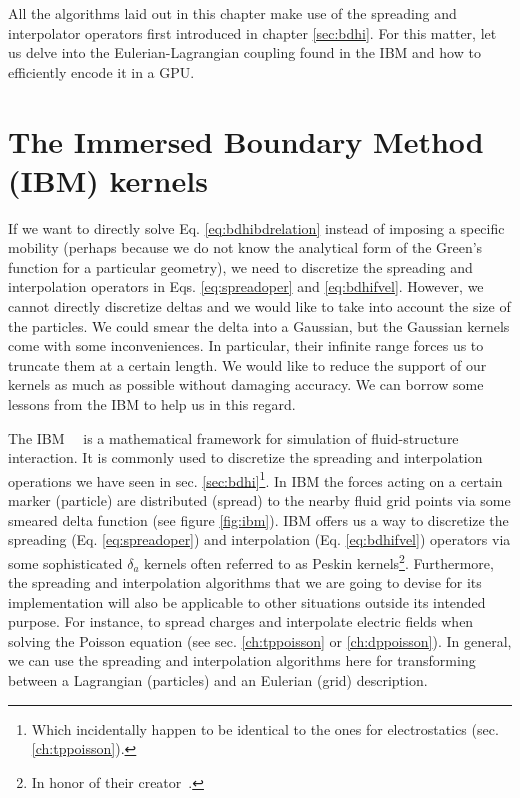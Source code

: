 \documentclass[twoside,openright,titlepage,numbers=noenddot,%
headinclude,footinclude,cleardoublepage=empty,abstract=on,
BCOR=5mm,fontsize=11pt, dvipsnames, paper=b5
]{scrreprt}
\newcommand{\gpu}{\gls{GPU}\xspace}
\begin{document}
All the algorithms laid out in this chapter make use of the spreading and interpolator operators first introduced in chapter \ref{sec:bdhi}. For this matter, let us delve into the Eulerian-Lagrangian coupling found in the \gls{IBM} and how to efficiently encode it in a \gpu.

\chapter{The Immersed Boundary Method (IBM) kernels}\label{sec:ibm}
If we want to directly solve Eq. \eqref{eq:bdhibdrelation} instead of imposing a specific mobility (perhaps because we do not know the analytical form of the Green's function for a particular geometry), we need to discretize the spreading and interpolation operators in Eqs. \eqref{eq:spreadoper} and \eqref{eq:bdhifvel}. However, we cannot directly discretize deltas and we would like to take into account the size of the particles. We could smear the delta into a Gaussian, but the Gaussian kernels come with some inconveniences. In particular, their infinite range forces us to truncate them at a certain length. We would like to reduce the support of our kernels as much as possible without damaging accuracy. We can borrow some lessons from the \gls{IBM} to help us in this regard.

The \gls{IBM}~\cite{Peskin1977}~\cite{Peskin2002} is a mathematical framework for simulation of fluid-structure interaction. It is commonly used to discretize the spreading and interpolation operations we have seen in sec. \ref{sec:bdhi}\footnote{Which incidentally happen to be identical to the ones for electrostatics (sec. \ref{ch:tppoisson}).}. In \gls{IBM} the forces acting on a certain marker (particle) are distributed (spread) to the nearby fluid grid points via some smeared delta function (see figure \ref{fig:ibm}). \gls{IBM} offers us a way to discretize the spreading (Eq. \eqref{eq:spreadoper}) and interpolation (Eq. \eqref{eq:bdhifvel}) operators via some sophisticated $\delta_a$ kernels often referred to as Peskin kernels\footnote{In honor of their creator~\cite{Peskin1977}.}.
Furthermore, the spreading and interpolation algorithms that we are going to devise for its implementation will also be applicable to other situations outside its intended purpose. For instance, to spread charges and interpolate electric fields when solving the Poisson equation (see sec. \ref{ch:tppoisson} or \ref{ch:dppoisson}). In general, we can use the spreading and interpolation algorithms here for transforming between a Lagrangian (particles) and an Eulerian (grid) description.
\end{document}
